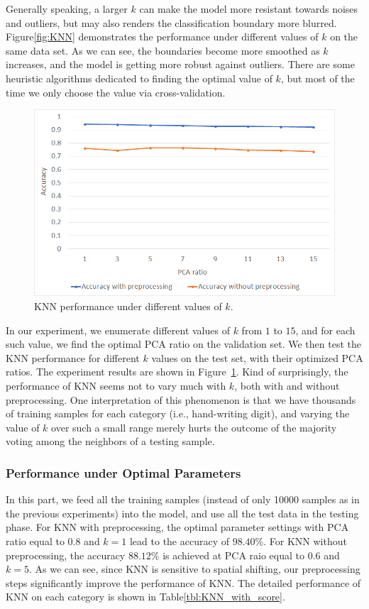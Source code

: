 \documentclass{article}
\begin{document}
Generally speaking, a larger $k$ can make the model more resistant towards noises and outliers, but may also renders the classification boundary more blurred. Figure\ref{fig:KNN} demonstrates the performance under different values of $k$ on the same data set. As we can see, the boundaries become more smoothed as $k$ increases, and the model is getting more robust against outliers. There are some heuristic algorithms dedicated to finding the optimal value of $k$, but most of the time we only choose the value via cross-validation. 

\begin{figure}[!htb]
	\centering\includegraphics[width=.8\textwidth]{fig//KNN_K}
	\caption{KNN performance under different values of $k$.}\label{fig:KNN_K}
\end{figure}


In our experiment, we enumerate different values of $k$ from $1$ to $15$, and for each such value, we find the optimal PCA ratio on the validation set. We then test the KNN performance for different $k$ values on the test set, with their optimized PCA ratios. The experiment results are shown in Figure~\ref{fig:KNN_K}. Kind of surprisingly, the performance of KNN seems not to vary much with $k$, both with and without preprocessing. One interpretation of this phenomenon is that we have thousands of training samples for each category (i.e., hand-writing digit), and varying the value of $k$ over such a small range merely hurts the outcome of the majority voting among the neighbors of a testing sample. 


\subsubsection{Performance under Optimal Parameters}
In this part, we feed all the training samples (instead of only 10000 samples as in the previous experiments) into the model, and use all the test data in the testing phase. For KNN with preprocessing, the optimal parameter settings with PCA ratio equal to $0.8$ and $k=1$ lead to the accuracy of $98.40\%$. For KNN without preprocessing, the accuracy $88.12\%$ is achieved at PCA raio equal to $0.6$ and $k=5$. As we can see, since KNN is sensitive to spatial shifting, our preprocessing steps significantly improve the performance of KNN. The detailed performance of KNN on each category is shown in Table\ref{tbl:KNN_with_score}.
\end{document}
